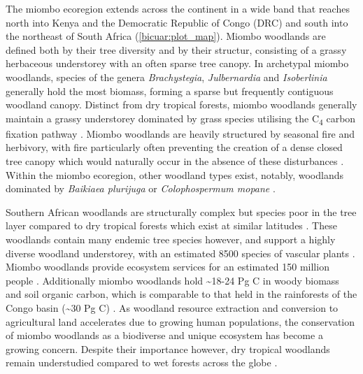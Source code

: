 \begin{refsection}
The miombo ecoregion extends across the continent in a wide band that reaches north into Kenya and the Democratic Republic of Congo (DRC) and south into the northeast of South Africa (\autoref{bicuar:plot_map}). Miombo woodlands are defined both by their tree diversity and by their structur, consisting of a grassy herbaceous understorey with an often sparse tree canopy. In archetypal miombo woodlands, species of the genera \textit{Brachystegia}, \textit{Julbernardia} and \textit{Isoberlinia} generally hold the most biomass, forming a sparse but frequently contiguous woodland canopy. Distinct from dry tropical forests, miombo woodlands generally maintain a grassy understorey dominated by grass species utilising the C\textsubscript{4} carbon fixation pathway \citep{Dexter2015}. Miombo woodlands are heavily structured by seasonal fire and herbivory, with fire particularly often preventing the creation of a dense closed tree canopy which would naturally occur in the absence of these disturbances \citep{Oliveras2016, Dantas2016}. Within the miombo ecoregion, other woodland types exist, notably, woodlands dominated by \textit{Baikiaea plurijuga} or \textit{Colophospermum mopane} \citep{Campbell2002}.

Southern African woodlands are structurally complex but species poor in the tree layer compared to dry tropical forests which exist at similar latitudes \citep{DRYFLOR2016, Torello2013}. These woodlands contain many endemic tree species however, and support a highly diverse woodland understorey, with an estimated 8500 species of vascular plants \citep{Frost1996}. Miombo woodlands provide ecosystem services for an estimated 150 million people \citep{Ryan2016}. Additionally miombo woodlands hold \textasciitilde{}18-24 Pg C in woody biomass and soil organic carbon, which is comparable to that held in the rainforests of the Congo basin (\textasciitilde{}30 Pg C) \citep{Mayaux2008}. As woodland resource extraction and conversion to agricultural land accelerates due to growing human populations, the conservation of miombo woodlands as a biodiverse and unique ecosystem has become a growing concern. Despite their importance however, dry tropical woodlands remain understudied compared to wet forests across the globe \citep{Clarke2017}. 


\end{refsection}
